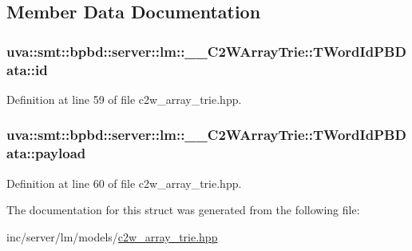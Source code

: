 \subsection{Member Data Documentation}
\hypertarget{structuva_1_1smt_1_1bpbd_1_1server_1_1lm_1_1_____c2_w_array_trie_1_1_t_word_id_p_b_data_a6f8ebf8866fd2bb8e9a9b2c114b9f8e1}{}
\subsubsection[{id}]{ uva\+::smt\+::bpbd\+::server\+::lm\+::\+\_\+\+\_\+\+C2\+W\+Array\+Trie\+::\+T\+Word\+Id\+P\+B\+Data\+::id}\label{structuva_1_1smt_1_1bpbd_1_1server_1_1lm_1_1_____c2_w_array_trie_1_1_t_word_id_p_b_data_a6f8ebf8866fd2bb8e9a9b2c114b9f8e1}


Definition at line 59 of file c2w\+\_\+array\+\_\+trie.\+hpp.

\hypertarget{structuva_1_1smt_1_1bpbd_1_1server_1_1lm_1_1_____c2_w_array_trie_1_1_t_word_id_p_b_data_a698578e589688c01e0b8c9c00e8bd114}{}
\subsubsection[{payload}]{ uva\+::smt\+::bpbd\+::server\+::lm\+::\+\_\+\+\_\+\+C2\+W\+Array\+Trie\+::\+T\+Word\+Id\+P\+B\+Data\+::payload}\label{structuva_1_1smt_1_1bpbd_1_1server_1_1lm_1_1_____c2_w_array_trie_1_1_t_word_id_p_b_data_a698578e589688c01e0b8c9c00e8bd114}


Definition at line 60 of file c2w\+\_\+array\+\_\+trie.\+hpp.



The documentation for this struct was generated from the following file\+:\begin{DoxyCompactItemize}
\item 
inc/server/lm/models/\hyperlink{c2w__array__trie_8hpp}{c2w\+\_\+array\+\_\+trie.\+hpp}\end{DoxyCompactItemize}
